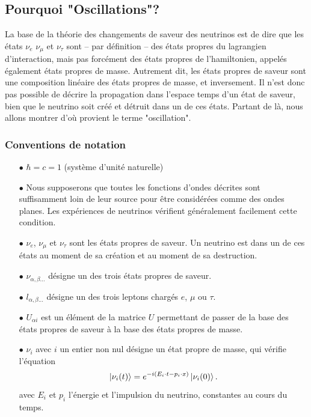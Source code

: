         \subsection{Pourquoi "Oscillations"?}\label{sec::oscillations}
            La base de la théorie des changements de saveur des neutrinos est de dire que les états $\nu_e$ $\nu_{\mu}$ et $\nu_{\tau}$ sont -- par définition -- des états propres du lagrangien d'interaction, mais pas forcément des états propres de l'hamiltonien, appelés également états propres de masse. Autrement dit, les états propres de saveur sont une composition linéaire des états propres de masse, et inversement. Il n'est donc pas possible de décrire la propagation dans l'espace temps d'un état de saveur, bien que le neutrino soit créé et détruit dans un de ces états. Partant de là, nous allons montrer d'où provient le terme "oscillation".
            
            \subsubsection{Conventions de notation}
            \begin{itemize}
                \item[$\bullet$] $\hbar = c = 1$ (système d'unité naturelle)
                \item[$\bullet$] Nous supposerons que toutes les fonctions d'ondes décrites sont suffisamment loin de leur source pour être considérées comme des ondes planes. Les expériences de neutrinos vérifient généralement facilement cette condition.
                \item[$\bullet$] $\nu_e$, $\nu_{\mu}$ et $\nu_{\tau}$ sont les états propres de saveur. Un neutrino est dans un de ces états au moment de sa création et au moment de sa destruction.
                \item[$\bullet$] $\nu_{\alpha,\beta...}$ désigne un des trois états propres de saveur.
                \item[$\bullet$] $l_{\alpha,\beta...}$ désigne un des trois leptons chargés $e$, $\mu$ ou $\tau$.
                \item[$\bullet$] $U_{\alpha i}$ est un élément de la matrice $U$ permettant de passer de la base des états propres de saveur à la base des états propres de masse.
                \item[$\bullet$] $\nu_{i}$ avec $i$ un entier non nul désigne un état propre de masse, qui vérifie l'équation
                \begin{equation}
                    \ket{\nu_i(t)} = e^{-i(E_i\cdot t - p_i\cdot x)}\ket{\nu_i(0)}.
                \end{equation}
                avec $E_i$ et $p_i$ l'énergie et l'impulsion du neutrino, constantes au cours du temps.
            \end{itemize}
            
